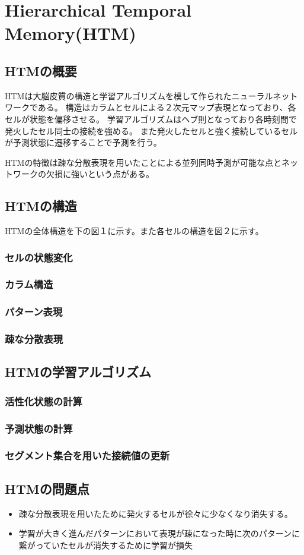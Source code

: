 \chapter{Hierarchical Temporal Memory(HTM)}
\section{HTMの概要}
HTMは大脳皮質の構造と学習アルゴリズムを模して作られたニューラルネットワークである。
構造はカラムとセルによる２次元マップ表現となっており、各セルが状態を偏移させる。
学習アルゴリズムはヘブ則となっており各時刻間で発火したセル同士の接続を強める。
また発火したセルと強く接続しているセルが予測状態に遷移することで予測を行う。

HTMの特徴は疎な分散表現を用いたことによる並列同時予測が可能な点とネットワークの欠損に強いという点がある。

\section{HTMの構造}
HTMの全体構造を下の図１に示す。また各セルの構造を図２に示す。


\subsection{セルの状態変化}
\subsection{カラム構造}
\subsection{パターン表現}
\subsection{疎な分散表現}


\section{HTMの学習アルゴリズム}
\subsection{活性化状態の計算}
\subsection{予測状態の計算}
\subsection{セグメント集合を用いた接続値の更新}


\section{HTMの問題点}
\begin{itemize}
  \item 疎な分散表現を用いたために発火するセルが徐々に少なくなり消失する。
  \item 学習が大きく進んだパターンにおいて表現が疎になった時に次のパターンに繋がっていたセルが消失するために学習が損失
\end{itemize}
